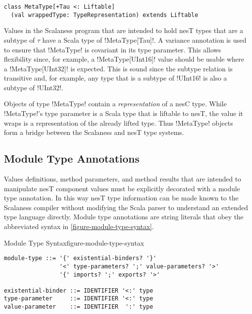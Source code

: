 \singlespace
\vspace{1.0ex}
\begin{lstlisting}[language=scalaness]
class MetaType[+Tau <: Liftable]
  (val wrappedType: TypeRepresentation) extends Liftable
\end{lstlisting}
\vspace{1.0ex}
\primaryspacing

Values in the Scalaness program that are intended to hold nesT types that are a subtype of
$\tau$ have a Scala type of !MetaType[Tau]!. A variance annotation is used to ensure that
!MetaType! is covariant in its type parameter. This allows flexibility since, for example, a
!MetaType[UInt16]! value should be usable where a !MetaType[UInt32]! is expected. This is sound
since the subtype relation is transitive and, for example, any type that is a subtype of
!UInt16! is also a subtype of !UInt32!.

Objects of type !MetaType! contain a \emph{representation} of a nesC type. While !MetaType!'s
type parameter is a Scala type that is liftable to nesT, the value it wraps is a representation
of the already lifted type. Thus !MetaType! objects form a bridge between the Scalaness and nesT
type systems.


\subsection{Module Type Annotations}
\label{section-module-type}

Values definitions, method parameters, and method results that are intended to manipulate nesT
component values must be explicitly decorated with a module type annotation. In this way nesT
type information can be made known to the Scalaness compiler without modifying the Scala parser
to understand an extended type language directly. Module type annotations are string literals
that obey the abbreviated syntax in \autoref{figure-module-type-syntax}.

\singlespace
\begin{fpfig}[tbhp]{Module Type Syntax}{figure-module-type-syntax}
{
\begin{Verbatim}
module-type ::= '{' existential-binders? '}'
                '<' type-parameters? ';' value-parameters? '>'
                '{' imports? ';' exports? '>'

existential-binder ::= IDENTIFIER '<:' type
type-parameter     ::= IDENTIFIER '<:' type
value-parameter    ::= IDENTIFIER  ':' type
\end{Verbatim}
}
\end{fpfig}
\primaryspacing

